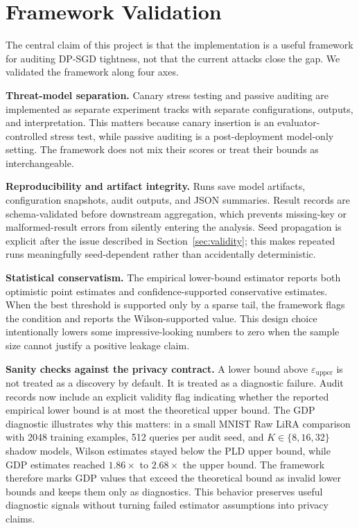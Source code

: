 \documentclass{article}
\begin{document}
\section{Framework Validation}

The central claim of this project is that the implementation is a useful framework for auditing DP-SGD tightness, not that the current attacks close the gap. We validated the framework along four axes.

\textbf{Threat-model separation.} Canary stress testing and passive auditing are implemented as separate experiment tracks with separate configurations, outputs, and interpretation. This matters because canary insertion is an evaluator-controlled stress test, while passive auditing is a post-deployment model-only setting. The framework does not mix their scores or treat their bounds as interchangeable.

\textbf{Reproducibility and artifact integrity.} Runs save model artifacts, configuration snapshots, audit outputs, and JSON summaries. Result records are schema-validated before downstream aggregation, which prevents missing-key or malformed-result errors from silently entering the analysis. Seed propagation is explicit after the issue described in Section~\ref{sec:validity}; this makes repeated runs meaningfully seed-dependent rather than accidentally deterministic.

\textbf{Statistical conservatism.} The empirical lower-bound estimator reports both optimistic point estimates and confidence-supported conservative estimates. When the best threshold is supported only by a sparse tail, the framework flags the condition and reports the Wilson-supported value. This design choice intentionally lowers some impressive-looking numbers to zero when the sample size cannot justify a positive leakage claim.

\textbf{Sanity checks against the privacy contract.} A lower bound above $\varepsilon_{\text{upper}}$ is not treated as a discovery by default. It is treated as a diagnostic failure. Audit records now include an explicit validity flag indicating whether the reported empirical lower bound is at most the theoretical upper bound. The GDP diagnostic illustrates why this matters: in a small MNIST Raw LiRA comparison with 2048 training examples, 512 queries per audit seed, and $K \in \{8,16,32\}$ shadow models, Wilson estimates stayed below the PLD upper bound, while GDP estimates reached $1.86\times$ to $2.68\times$ the upper bound. The framework therefore marks GDP values that exceed the theoretical bound as invalid lower bounds and keeps them only as diagnostics. This behavior preserves useful diagnostic signals without turning failed estimator assumptions into privacy claims.
\end{document}
